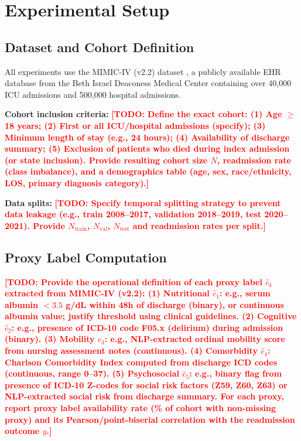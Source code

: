 \documentclass[review,12pt,authoryear]{elsarticle}
\newcommand{\todo}[1]{\textcolor{red}{\textbf{[TODO: #1]}}}
\newcommand{\dataset}{MIMIC-IV (v2.2)}
\begin{document}
\section{Experimental Setup}
\label{sec:experiments}

\subsection{Dataset and Cohort Definition}

All experiments use the \dataset{} dataset \citep{johnson2023mimic}, a publicly available EHR database from the Beth Israel Deaconess Medical Center containing over 40,000 ICU admissions and 500,000 hospital admissions.

\textbf{Cohort inclusion criteria:}
\todo{Define the exact cohort: (1) Age $\geq$ 18 years; (2) First or all ICU/hospital admissions (specify); (3) Minimum length of stay (e.g., 24 hours); (4) Availability of discharge summary; (5) Exclusion of patients who died during index admission (or state inclusion). Provide resulting cohort size $N$, readmission rate (class imbalance), and a demographics table (age, sex, race/ethnicity, LOS, primary diagnosis category).}

\textbf{Data splits:}
\todo{Specify temporal splitting strategy to prevent data leakage (e.g., train 2008–2017, validation 2018–2019, test 2020–2021). Provide $N_\text{train}$, $N_\text{val}$, $N_\text{test}$ and readmission rates per split.}

\subsection{Proxy Label Computation}

\todo{Provide the operational definition of each proxy label $\hat{c}_k$ extracted from \dataset{}:
(1) \textbf{Nutritional} $\hat{c}_1$: e.g., serum albumin $<3.5$ g/dL within 48h of discharge (binary), or continuous albumin value; justify threshold using clinical guidelines.
(2) \textbf{Cognitive} $\hat{c}_2$: e.g., presence of ICD-10 code F05.x (delirium) during admission (binary).
(3) \textbf{Mobility} $\hat{c}_3$: e.g., NLP-extracted ordinal mobility score from nursing assessment notes (continuous).
(4) \textbf{Comorbidity} $\hat{c}_4$: Charlson Comorbidity Index computed from discharge ICD codes (continuous, range 0–37).
(5) \textbf{Psychosocial} $\hat{c}_5$: e.g., binary flag from presence of ICD-10 Z-codes for social risk factors (Z59, Z60, Z63) or NLP-extracted social risk from discharge summary.
For each proxy, report proxy label availability rate (\% of cohort with non-missing proxy) and its Pearson/point-biserial correlation with the readmission outcome $y$.}
\end{document}
